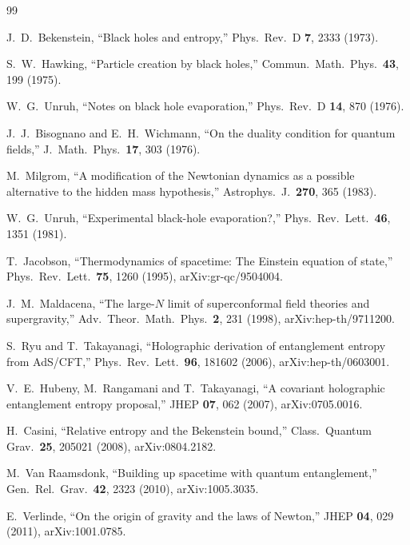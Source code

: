 \documentclass[11pt]{article}
\theoremstyle{definition}
\begin{document}
\begin{thebibliography}{99}\small

J.~D.~Bekenstein, ``Black holes and entropy,''
Phys.\ Rev.\ D \textbf{7}, 2333 (1973).

S.~W.~Hawking, ``Particle creation by black holes,''
Commun.\ Math.\ Phys.\ \textbf{43}, 199 (1975).

W.~G.~Unruh, ``Notes on black hole evaporation,''
Phys.\ Rev.\ D \textbf{14}, 870 (1976).

J.~J.~Bisognano and E.~H.~Wichmann, ``On the duality condition for quantum
fields,'' J.\ Math.\ Phys.\ \textbf{17}, 303 (1976).

M.~Milgrom, ``A modification of the Newtonian dynamics as a possible
alternative to the hidden mass hypothesis,''
Astrophys.\ J.\ \textbf{270}, 365 (1983).

W.~G.~Unruh, ``Experimental black-hole evaporation?,''
Phys.\ Rev.\ Lett.\ \textbf{46}, 1351 (1981).

T.~Jacobson, ``Thermodynamics of spacetime: The Einstein equation of state,''
Phys.\ Rev.\ Lett.\ \textbf{75}, 1260 (1995), arXiv:gr-qc/9504004.

J.~M.~Maldacena, ``The large-$N$ limit of superconformal field theories and
supergravity,'' Adv.\ Theor.\ Math.\ Phys.\ \textbf{2}, 231 (1998),
arXiv:hep-th/9711200.

S.~Ryu and T.~Takayanagi, ``Holographic derivation of entanglement entropy
from AdS/CFT,'' Phys.\ Rev.\ Lett.\ \textbf{96}, 181602 (2006),
arXiv:hep-th/0603001.

V.~E.~Hubeny, M.~Rangamani and T.~Takayanagi, ``A covariant holographic
entanglement entropy proposal,'' JHEP \textbf{07}, 062 (2007),
arXiv:0705.0016.

H.~Casini, ``Relative entropy and the Bekenstein bound,''
Class.\ Quantum Grav.\ \textbf{25}, 205021 (2008), arXiv:0804.2182.

M.~Van Raamsdonk, ``Building up spacetime with quantum entanglement,''
Gen.\ Rel.\ Grav.\ \textbf{42}, 2323 (2010), arXiv:1005.3035.

E.~Verlinde, ``On the origin of gravity and the laws of Newton,''
JHEP \textbf{04}, 029 (2011), arXiv:1001.0785.


\end{thebibliography}
\end{document}
